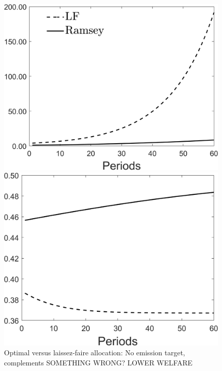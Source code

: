 \begin{figure}[h!!]
	\centering
	\caption{Optimal versus laissez-faire allocation: No emission target, complements SOMETHING WRONG? LOWER WELFARE}\label{fig:optallo_comp}
	\begin{minipage}[]{0.32\textwidth}
		\includegraphics[width=1\textwidth]{../codding_model/Own/figures/Rep_agent/staticRam_LF_separate_c_periods59_eppsilon0.40_zeta1.40_Ad08_Ac04_thetac0.70_thetad0.56_HetGrowth1_tauul0.181_util0_withtarget0_lgd1.png}
	\end{minipage}
	\begin{minipage}[]{0.32\textwidth}
		\includegraphics[width=1\textwidth]{../codding_model/Own/figures/Rep_agent/staticRam_LF_separate_hh_periods59_eppsilon0.40_zeta1.40_Ad08_Ac04_thetac0.70_thetad0.56_HetGrowth1_tauul0.181_util0_withtarget0_lgd0.png}

\end{minipage}
\end{figure}
